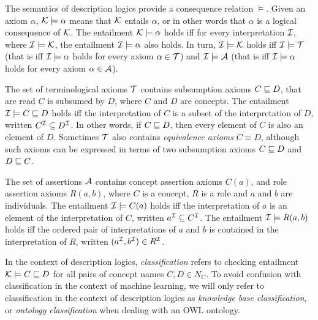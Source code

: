 The semantics of description logics provide a consequence relation $\models$.
Given an axiom $\alpha$, $\mathcal{K} \models \alpha$ means that $\mathcal{K}$ entails $\alpha$, or in other words that $\alpha$ is a logical consequence of $\mathcal{K}$.
The entailment $\mathcal{K} \models \alpha$ holds iff for every interpretation $\mathcal{I}$, where $\mathcal{I} \models \mathcal{K}$, the entailment $\mathcal{I} \models \alpha$ also holds.
In turn, $\mathcal{I} \models \mathcal{K}$ holds iff $\mathcal{I} \models \mathcal{T}$ (that is iff $\mathcal{I} \models \alpha$ holds for every axiom $\alpha \in \mathcal{T}$) and $\mathcal{I} \models \mathcal{A}$ (that is iff $\mathcal{I} \models \alpha$ holds for every axiom $\alpha \in \mathcal{A}$).

The set of terminological axioms $\mathcal{T}$ contains subsumption axioms $C \sqsubseteq D$, that are read $C$ is subsumed by $D$, where $C$ and $D$ are concepts.
The entailment $\mathcal{I} \models C \sqsubseteq D$ holds iff the interpretation of $C$ is a subset of the interpretation of $D$, written $C^{\mathcal{I}} \subseteq D^{\mathcal{I}}$.
In other words, if $C \sqsubseteq D$, then every element of $C$ is also an element of $D$.
Sometimes $\mathcal{T}$ also contains \emph{equivalence axioms} $C \equiv D$, although such axioms can be expressed in terms of two subsumption axioms $C \sqsubseteq D$ and $D \sqsubseteq C$.

The set of assertions $\mathcal{A}$ contains concept assertion axioms $C(a)$, and role assertion axioms $R(a, b)$, where $C$ is a concept, $R$ is a role and $a$ and $b$ are individuals.
The entailment $\mathcal{I} \models C(a)$ holds iff the interpretation of $a$ is an element of the interpretation of $C$, written $a^{\mathcal{I}} \subseteq C^{\mathcal{I}}$.
The entailment $\mathcal{I} \models R(a, b)$ holds iff the ordered pair of interpretations of $a$ and $b$ is contained in the interpretation of $R$, written $(a^{\mathcal{I}}, b^{\mathcal{I}}) \in R^{\mathcal{I}}$.

In the context of description logics, \emph{classification} refers to checking entailment $\mathcal{K} \models C \sqsubseteq D$ for all pairs of concept names $C, D \in N_C$.
To avoid confusion with classification in the context of machine learning, we will only refer to classification in the context of description logics as \emph{knowledge base classification}, or \emph{ontology classification} when dealing with an OWL ontology.

